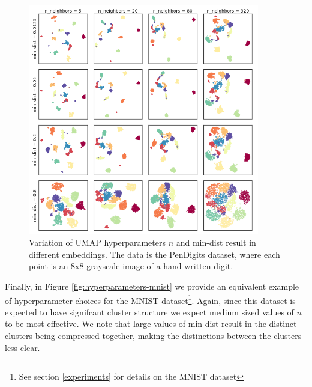 \documentclass[12pt]{article}
\begin{document}
\begin{figure}
    \centering
    \includegraphics[width=0.9\textwidth]{hyperparameters_pendigits.png}
    \caption{Variation of UMAP hyperparameters $n$ and min-dist result in different embeddings. The data is the PenDigits dataset, where each point is an 8x8 grayscale image of a hand-written digit.}
    \label{fig:hyperparameters-pendigits}
\end{figure}

Finally, in Figure \ref{fig:hyperparameters-mnist} we provide an equivalent example of hyperparameter choices for the MNIST dataset\footnote{See section \ref{experiments} for details on the MNIST dataset}. Again, since this dataset is expected to have signifcant cluster structure we expect medium sized values of $n$ to be most effective. We note that large values of min-dist result in the distinct clusters being compressed together, making the distinctions between the clusters less clear.
\end{document}
